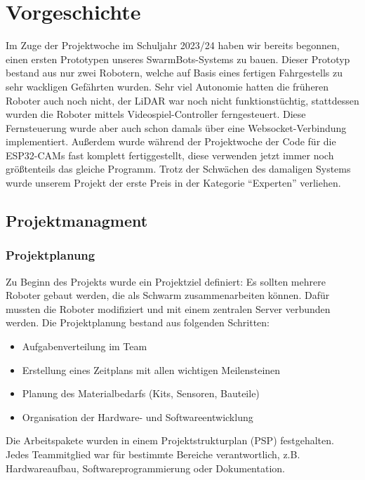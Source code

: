 \chapter{Vorgeschichte}
\label{sec:vorgeschichte}
Im Zuge der Projektwoche im Schuljahr 2023/24 haben wir bereits begonnen,
einen ersten Prototypen unseres SwarmBots-Systems zu bauen.
%
Dieser Prototyp bestand aus nur zwei Robotern,
welche auf Basis eines fertigen Fahrgestells zu sehr wackligen Gefährten wurden.
%
Sehr viel Autonomie hatten die früheren Roboter auch noch nicht,
der LiDAR war noch nicht funktionstüchtig,
stattdessen wurden die Roboter mittels Videospiel-Controller ferngesteuert.
%
Diese Fernsteuerung wurde aber auch schon damals über eine Websocket-Verbindung implementiert.
%
Außerdem wurde während der Projektwoche der Code für die ESP32-CAMs fast komplett fertiggestellt,
diese verwenden jetzt immer noch größtenteils das gleiche Programm.
%
Trotz der Schwächen des damaligen Systems wurde unserem Projekt
der erste Preis in der Kategorie ``Experten'' verliehen.


\section{Projektmanagment}
\label{subsec:projektmanagment}
%
\subsection{Projektplanung}
%
Zu Beginn des Projekts wurde ein Projektziel definiert:
Es sollten mehrere Roboter gebaut werden, die als Schwarm zusammenarbeiten können. Dafür mussten die Roboter modifiziert und mit einem zentralen Server verbunden werden.
Die Projektplanung bestand aus folgenden Schritten:
\begin{itemize}
    \item Aufgabenverteilung im Team
    \item Erstellung eines Zeitplans mit allen wichtigen Meilensteinen
    \item Planung des Materialbedarfs (Kits, Sensoren, Bauteile)
    \item Organisation der Hardware- und Softwareentwicklung
\end{itemize}
Die Arbeitspakete wurden in einem Projektstrukturplan (PSP) festgehalten.
Jedes Teammitglied war für bestimmte Bereiche verantwortlich, z.B. Hardwareaufbau, Softwareprogrammierung oder Dokumentation.
%
